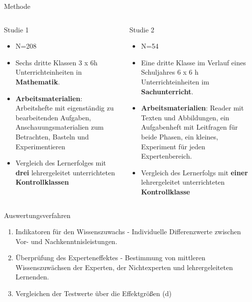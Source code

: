 \begin{block}{Methode}
\begin{columns}[t,totalwidth=\twocolwid]

\begin{column}{\onecolwid}\vspace{-.6in}
\centering Studie 1
\linebreak
\begin{itemize}
\justifying
\item N=208
\item Sechs dritte Klassen 3 x 6h Unterrichteinheiten in \textbf{Mathematik}.
\item \textbf{Arbeitsmaterialien}: Arbeitshefte mit eigenständig zu bearbeitenden Aufgaben, Anschauungsmaterialien zum Betrachten, Basteln und Experimentieren
\item Vergleich des Lernerfolges  mit \textbf{drei} lehrergeleitet unterrichteten \textbf{Kontrollklassen}
\end{itemize}
\end{column}

\begin{column}{\onecolwid}\vspace{-.6in}
\centering Studie 2
\linebreak
\begin{itemize}
\justifying
\item N=54
\item Eine dritte Klasse  im Verlauf  eines Schuljahres 6 x 6 h Unterrichteinheiten im \textbf{Sachunterricht}.
\item \textbf{Arbeitsmaterialien}: Reader mit Texten und Abbildungen, ein Aufgabenheft mit Leitfragen für beide Phasen, ein kleines, Experiment für jeden Expertenbereich.
\item Vergleich des Lernerfolgs mit \textbf{einer} lehrergeleitet unterrichteten \textbf{Kontrollklasse}
\end{itemize}
\end{column}

\end{columns}
\end{block}

\begin{block}{Auswertungsverfahren}
\begin{enumerate}
\item Indikatoren für den Wissenszuwachs - Individuelle Differenzwerte zwischen Vor- und Nachkenntnisleistungen.
\item Überprüfung des Experteneffektes - Bestimmung von mittleren Wissenszuwächsen der Experten, der Nichtexperten und lehrergeleiteten Lernenden.
\item Vergleichen der Testwerte über die Effektgrößen (d)
\end{enumerate}
\end{block} 

